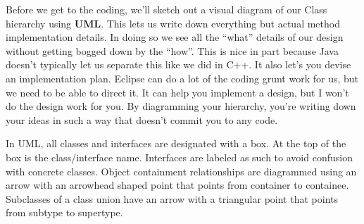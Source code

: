 \documentclass[]{tufte-handout}
\begin{document}
Before we get to the coding, we'll sketch out a visual diagram of our Class hierarchy using \textbf{UML}. This lets us write down everything but actual method implementation details. In doing so we see all the ``what'' details of our design without getting bogged down by the ``how''.  This is nice in part because Java doesn't typically let us separate this like we did in C++.  It also let's you devise an implementation plan.  Eclipse can do a lot of the coding grunt work for us, but we need to be able to direct it. It can help you implement a design, but I won't do the design work for you. By diagramming your hierarchy, you're writing down your ideas in such a way that doesn't commit you to any code.

In UML, all classes and interfaces are designated with a box. At the top of the box is the class/interface name. Interfaces are labeled as such to avoid confusion with concrete classes. Object containment relationships are diagrammed using an arrow with an arrowhead shaped point that points from container to containee. Subclasses of a class union have an arrow with a triangular point that points from subtype to supertype. 
\end{document}
